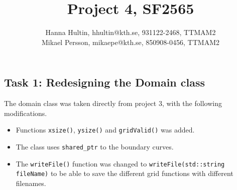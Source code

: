 \documentclass[a4paper,10pt]{article}
\title{Project 4, SF2565}
\author{Hanna Hultin, hhultin@kth.se, 931122-2468, TTMAM2 \\ Mikael Persson, mikaepe@kth.se, 850908-0456, TTMAM2}
\begin{document}
\maketitle

\subsection*{Task 1: Redesigning the Domain class}
The domain class was taken directly from project 3, with the following modifications. 
\begin{itemize}
  \item
    Functions \texttt{xsize()}, \texttt{ysize()} and \texttt{gridValid()} was added.
  \item The class uses \texttt{shared\_ptr} to the boundary curves. 
  \item
    The \texttt{writeFile()} function was changed to 
    \texttt{writeFile(std::string fileName)} to be able to save the 
    different grid functions with different filenames.
\end{itemize}
\end{document}
